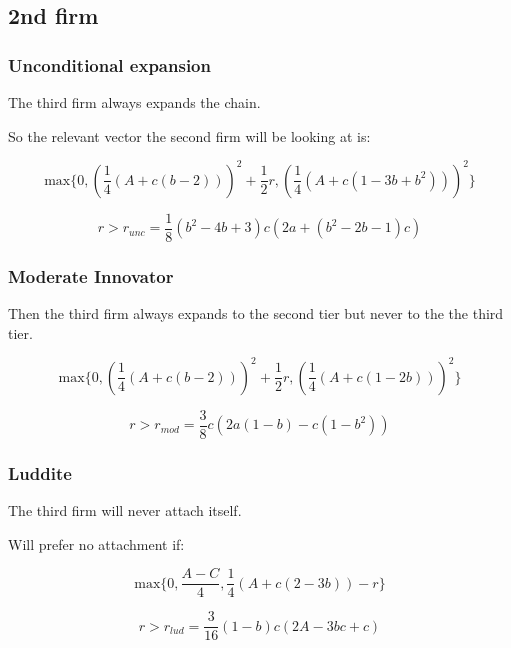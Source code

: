 \documentclass{article}
\begin{document}
\subsection{2nd firm}

\subsubsection{Unconditional expansion } The third firm always expands the chain. 

So the relevant vector the second firm will be looking at is: 

\begin{equation*}
\text{max} \{ 
0, \left(\frac{1}{4}(A+ c(b-2)) \right)^2+\frac{1}{2}r, \left(\frac{1}{4}(A+c(1-3b+b^2)) \right)^2
\}
\end{equation*}

\begin{equation*}
r>r_{unc}=\frac{1}{8} \left(b^2-4 b+3\right) c \left(2 a+\left(b^2-2 b-1\right) c\right)
\end{equation*}

\subsubsection{Moderate Innovator} Then the third firm always expands to the second tier but never to the the third tier. 

\begin{equation*}
\text{max} \{ 
0, \left(\frac{1}{4}(A+ c(b-2)) \right)^2+\frac{1}{2}r, \left( \frac{1}{4}(A+c(1-2b)) \right)^2
\}
\end{equation*}

\begin{equation*}
r>r_{mod}= \frac{3}{8} c \left(2 a (1-b)-c(1-b^2)\right)    
\end{equation*}

\subsubsection{Luddite}

The third firm will never attach itself. 

Will prefer no attachment if: 

\begin{equation*}
\text{max} \{ 
0, \frac{A-C}{4}, \frac{1}{4}(A+c(2-3b))-r
\}
\end{equation*}

\begin{equation*}
r> r_{lud} = \frac{3}{16} (1-b) c (2 A-3 b c+c)
\end{equation*}
\end{document}
